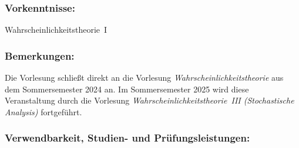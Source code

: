 \documentclass[a4paper,10pt]{article}
\begin{document}
\subsubsection*{\large
    Vorkenntnisse:
}
Wahrscheinlichkeitstheorie~I
\subsubsection*{\large
    Bemerkungen:
}
Die Vorlesung schließt direkt an die Vorlesung {\em Wahrscheinlichkeitstheorie} aus dem Sommersemester 2024 an. Im Sommersemester 2025 wird diese Veranstaltung durch die Vorlesung {\em Wahrscheinlichkeitstheorie~III (Stochastische Analysis)} fortgeführt.
\subsubsection*{\large
    Verwendbarkeit, Studien- und Prüfungsleistungen:
}
\end{document}
